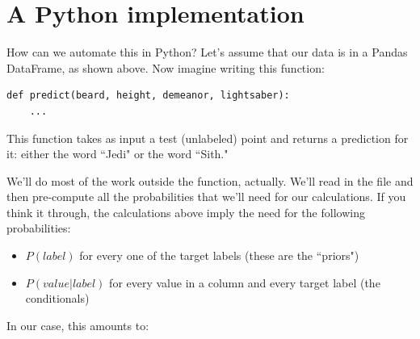 \documentclass[12pt]{article}
\begin{document}
\section{A Python implementation}

How can we automate this in Python? Let's assume that our data is in a Pandas
DataFrame, as shown above. Now imagine writing this function:

\begin{Verbatim}[fontsize=\small,samepage=true,frame=none]
def predict(beard, height, demeanor, lightsaber):
    ...
\end{Verbatim}

This function takes as input a test (unlabeled) point and returns a prediction
for it: either the word ``Jedi" or the word ``Sith."

\pagebreak    %

We'll do most of the work outside the function, actually. We'll read in the
file and then pre-compute all the probabilities that we'll need for our
calculations. If you think it through, the calculations above imply the need
for the following probabilities:

\begin{itemize}
\itemsep.1em
\item $P(label)$ for every one of the target labels (these are the ``priors")
\item $P(value|label)$ for every value in a column and every target label (the
conditionals)
\end{itemize}

In our case, this amounts to:
\end{document}
